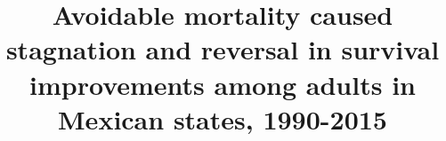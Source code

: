 \documentclass{bmcart}
\begin{document}
\begin{frontmatter}

\begin{fmbox}


\title{Avoidable mortality caused stagnation and reversal in survival improvements among adults in Mexican states, 1990-2015}


\author[
   addressref={aff1},                   %
   corref={aff1},     
   noteref={n1},                  %
   email={jmaburto@health.sdu.dk}   %
]{ }
\author[
   addressref={aff2},
   noteref={n1},
   email={riffe@demogr.mpg.de}
]{ }
\author[
   addressref={aff1},                   %
   email={vcanudas@health.sdu.dk}
]{ }


\address[id=aff1]{%
  , %
  ,                     %
  ,                              %
}
\address[id=aff2]{%
  ,
  ,
  ,
}


\end{fmbox}
\end{frontmatter}
\end{document}
